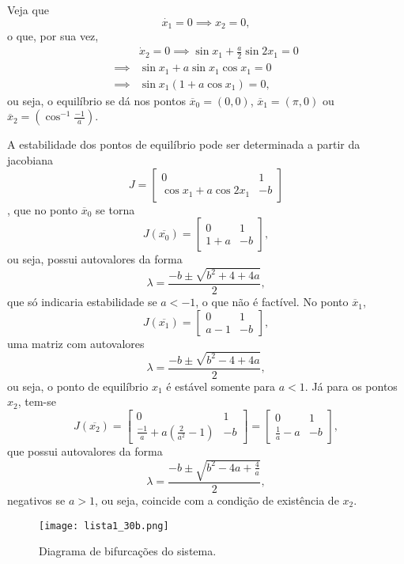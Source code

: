 \documentclass[a4paper]{report}
\begin{document}


Veja que \[
\dot{x_1} = 0 \implies x_2 = 0
,\] o que, por sua vez,
\begin{align*}
    & \dot{x}_2 = 0 \implies \sin x_1 + \frac{a}{2}\sin 2x_1 = 0 \\
    \implies & \sin x_1 + a \sin x_1 \cos x_1 = 0 \\
    \implies & \sin x_1 \left( 1 + a \cos x_1 \right) =0
,\end{align*}
ou seja, o equilíbrio se dá nos pontos $\overline{x}_0 = (0,0)$, $\overline{x}_1 = \left(\pi, 0\right)$ ou $\overline{x}_2 = \left( \cos ^{-1}\frac{-1}{a} \right) $.

A estabilidade dos pontos de equilíbrio pode ser determinada a partir da jacobiana \[
J = \begin{bmatrix} 
    0 & 1 \\
    \cos x_1 + a\cos 2x_1 & -b
\end{bmatrix} 
\], que no ponto $\overline{x}_0$ se torna \[
J(\overline{x_0}) = \begin{bmatrix} 0 & 1 \\ 1+a & -b \end{bmatrix} 
,\] ou seja, possui autovalores da forma \[
\lambda = \frac{-b \pm \sqrt{b^2 +4 +4a} }{2}
,\] que só indicaria estabilidade se $a<-1$, o que não é factível. No ponto $\overline{x}_1$,\[
J(\overline{x_1}) = \begin{bmatrix} 0 & 1 \\ a-1 & -b \end{bmatrix} 
,\] uma matriz com autovalores  \[
\lambda = \frac{-b \pm \sqrt{b^2 -4 +4a} }{2}
,\] ou seja, o ponto de equilíbrio $x_1$ é estável somente para $a<1$. Já para os pontos $x_2$, tem-se \[
J(\overline{x_2}) = \begin{bmatrix} 0 & 1 \\ \frac{-1}{a} + a\left( \frac{2}{a^2} -1 \right) & -b  \end{bmatrix} = \begin{bmatrix} 0 & 1 \\ \frac{1}{a} -a & -b \end{bmatrix} 
,\] que possui autovalores da forma \[
\lambda = \frac{-b \pm \sqrt{b^2 -4a +\frac{4}{a}} }{2}
,\] negativos se $a>1$, ou seja, coincide com a condição de existência de $x_2$.


\begin{figure}[H]
    \centering
    \texttt{[image: lista1\_30b.png]}
    \caption{Diagrama de bifurcações do sistema.}
    \label{fig:lista1_30b-png}
\end{figure}
\end{document}
